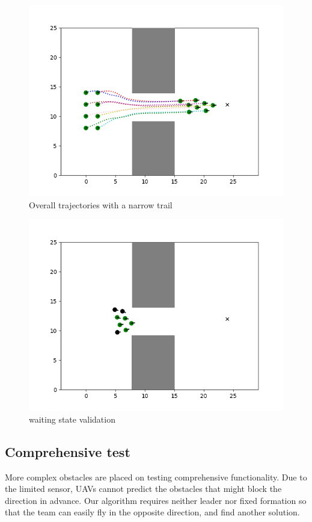 \begin{figure}[H]
    \centering
    \includegraphics[scale=1]{figures/trail_overall.png}
    \caption{Overall trajectories with a narrow trail}
    \label{fig:fig_label}
\end{figure}
\begin{figure}[H]
    \centering
    \includegraphics[scale=1]{figures/trail_enter.png}
    \caption{waiting state validation}
    \label{fig:fig_label}
\end{figure}

\subsection{Comprehensive test}
More complex obstacles are placed on testing comprehensive functionality. Due to the limited sensor, UAVs cannot predict the obstacles that might block the direction in advance. Our algorithm requires neither leader nor fixed formation so that the team can easily fly in the opposite direction, and find another solution. 

